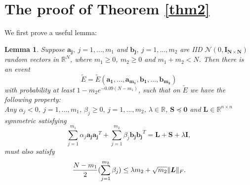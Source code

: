\documentclass[11pt]{article}
\newtheorem{lemma}[theorem]{Lemma}
\newcommand{\<}{\langle}
\renewcommand{\>}{\rangle}
\newcommand{\vct}[1]{\bm{#1}}
\newcommand{\mtx}[1]{\bm{#1}}
\numberwithin{equation}{section}
\begin{document}
\section{The proof of Theorem \ref{thm2}}
We first prove a useful lemma:
\begin{lemma}
\label{lemma3.1}
Suppose $\vct{a_j},~j=1,...,m_1$ and $\vct{b_j}, ~j=1,..., m_2$ are IID $\mathcal{N}(0, \mtx{I_{N\times N}})$ random vectors in $
\mathbb{R}^N$, where $m_1\geq 0$, $m_2\geq 0$ and $m_1+m_2<N$. Then there is an event 
\[
\widetilde{E} =\widetilde{E}(\vct{a_1},..., \vct{a_{m_1}}, \vct{b_1},..., \vct{b_{m_2}})
\]
with probability at least $1-m_2e^{-0.09(N-m_1)}$, such that on $\widetilde{E}$ we have the following property:\\
Any $\alpha_j<0, ~ j=1,..., m_1$,  $\beta_j\geq 0, ~ j=1,..., m_2$, $\lambda \in \mathbb{R}$, $\mtx{S} \preceq \mtx{0}$ and $\mtx{L} \in \mathbb{R}^{n \times n}$ symmetric satisfying
\[
\sum_{j=1}^{m_1}\alpha_j\vct{a_j}\vct{a_j}^T+\sum_{j=1}^{m_2}\beta_j\vct{b_j}\vct{b_j}^T=\mtx{L}+\mtx{S}+\lambda\mtx{I},
\]
must also satisfy 
\[
{{N-m_1}\over 2}(\sum_{j=1}^{m_2}\beta_j)\leq \lambda m_2+\sqrt{m_2}\|\mtx{L}\|_F.
\]
\end{lemma}
\end{document}
